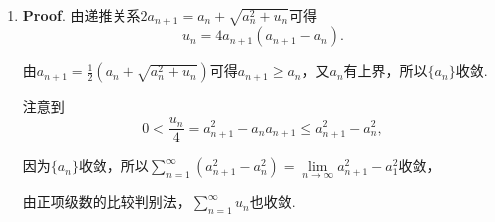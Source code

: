 \documentclass[../Main.tex]{subfiles}
\begin{document}
\begin{enumerate}
  \item \textbf{Proof}. 由递推关系$2a_{n+1} = a_n + \sqrt{a_n^2 + u_n}$可得
        \[
          u_n=4a_{n+1}\left(a_{n+1}-a_n\right).
        \]

        由$a_{n+1}=\frac{1}{2}\left(a_n+\sqrt{a_n^2+u_n}\right)$可得$a_{n+1}\geq a_n$，又$a_n$有上界，所以$\{a_n\}$收敛.

        注意到
        \[
          0<\frac{u_n}{4}=a_{n+1}^2-a_na_{n+1}\leq a_{n+1}^2-a_n^2,
        \]

        因为$\{a_n\}$收敛，所以$\sum\limits_{n=1}^{\infty} (a_{n+1}^2 - a_n^2)=\lim\limits_{n\to\infty} a_{n+1}^2 - a_1^2$收敛，

        由正项级数的比较判别法，$\sum\limits_{n=1}^{\infty} u_n$也收敛.

\end{enumerate}
\end{document}
